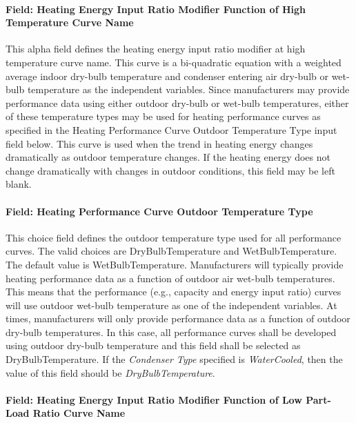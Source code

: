\paragraph{Field: Heating Energy Input Ratio Modifier Function of High Temperature Curve Name}\label{field-heating-energy-input-ratio-modifier-function-of-high-temperature-curve-name}

This alpha field defines the heating energy input ratio modifier at high temperature curve name. This curve is a bi-quadratic equation with a weighted average indoor dry-bulb temperature and condenser entering air dry-bulb or wet-bulb temperature as the independent variables. Since manufacturers may provide performance data using either outdoor dry-bulb or wet-bulb temperatures, either of these temperature types may be used for heating performance curves as specified in the Heating Performance Curve Outdoor Temperature Type input field below. This curve is used when the trend in heating energy changes dramatically as outdoor temperature changes. If the heating energy does not change dramatically with changes in outdoor conditions, this field may be left blank.

\paragraph{Field: Heating Performance Curve Outdoor Temperature Type}\label{field-heating-performance-curve-outdoor-temperature-type}

This choice field defines the outdoor temperature type used for all performance curves. The valid choices are DryBulbTemperature and WetBulbTemperature. The default value is WetBulbTemperature. Manufacturers will typically provide heating performance data as a function of outdoor air wet-bulb temperatures. This means that the performance (e.g., capacity and energy input ratio) curves will use outdoor wet-bulb temperature as one of the independent variables. At times, manufacturers will only provide performance data as a function of outdoor dry-bulb temperatures. In this case, all performance curves shall be developed using outdoor dry-bulb temperature and this field shall be selected as DryBulbTemperature. If the \textit{Condenser Type} specified is \textit{WaterCooled}, then the value of this field should be \textit{DryBulbTemperature}. 

\paragraph{Field: Heating Energy Input Ratio Modifier Function of Low Part-Load Ratio Curve Name}\label{field-heating-energy-input-ratio-modifier-function-of-low-part-load-ratio-curve-name}

